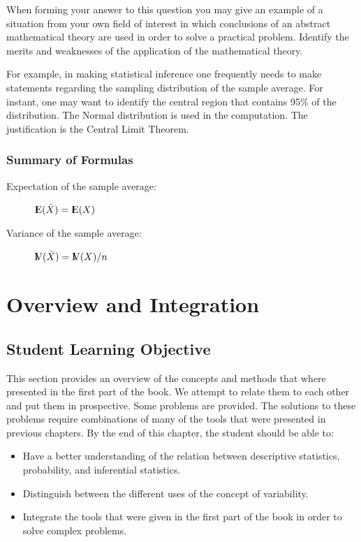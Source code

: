 \documentclass[]{krantz}
\newcommand{\Expec}{{\rm I\kern-.3em E}}
\newcommand{\Var}{{\rm I\kern-.3em V}}
\theoremstyle{definition}
\theoremstyle{definition}
\theoremstyle{definition}
\theoremstyle{remark}
\begin{document}
When forming your answer to this question you may give an example of a
situation from your own field of interest in which conclusions of an
abstract mathematical theory are used in order to solve a practical
problem. Identify the merits and weaknesses of the application of the
mathematical theory.

For example, in making statistical inference one frequently needs to
make statements regarding the sampling distribution of the sample
average. For instant, one may want to identify the central region that
contains 95\% of the distribution. The Normal distribution is used in the
computation. The justification is the Central Limit Theorem.

\hypertarget{summary-of-formulas}{%
\subsection*{Summary of Formulas}\label{summary-of-formulas}}


\begin{description}
\item[Expectation of the sample average:]
\(\Expec(\bar X) = \Expec(X)\)
\item[Variance of the sample average:]
\(\Var(\bar X) = \Var(X)/n\)
\end{description}

\hypertarget{overview-and-integration}{%
\chapter{Overview and Integration}\label{overview-and-integration}}

\hypertarget{student-learning-objective-4}{%
\section{Student Learning Objective}\label{student-learning-objective-4}}

This section provides an overview of the concepts and methods that where
presented in the first part of the book. We attempt to relate them to
each other and put them in prospective. Some problems are provided. The
solutions to these problems require combinations of many of the tools
that were presented in previous chapters. By the end of this chapter,
the student should be able to:

\begin{itemize}
\item
  Have a better understanding of the relation between descriptive
  statistics, probability, and inferential statistics.
\item
  Distinguish between the different uses of the concept of
  variability.
\item
  Integrate the tools that were given in the first part of the book in
  order to solve complex problems.
\end{itemize}
\end{document}
